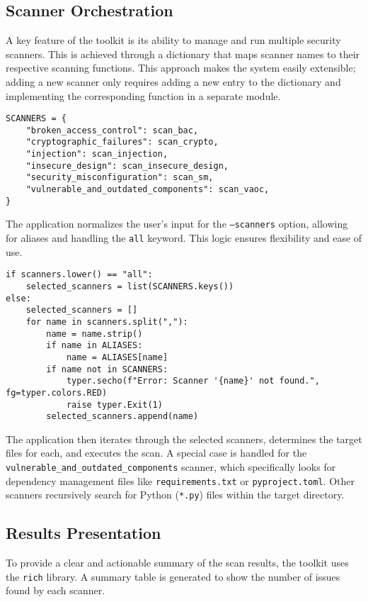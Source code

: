 \subsection{Scanner Orchestration}

A key feature of the toolkit is its ability to manage and run multiple security scanners. This is achieved through a dictionary that maps scanner names to their respective scanning functions. This approach makes the system easily extensible; adding a new scanner only requires adding a new entry to the dictionary and implementing the corresponding function in a separate module.

\begin{verbatim}
SCANNERS = {
    "broken_access_control": scan_bac,
    "cryptographic_failures": scan_crypto,
    "injection": scan_injection,
    "insecure_design": scan_insecure_design,
    "security_misconfiguration": scan_sm,
    "vulnerable_and_outdated_components": scan_vaoc,
}
\end{verbatim}

The application normalizes the user's input for the \texttt{--scanners} option, allowing for aliases and handling the \texttt{all} keyword. This logic ensures flexibility and ease of use.

\begin{verbatim}
if scanners.lower() == "all":
    selected_scanners = list(SCANNERS.keys())
else:
    selected_scanners = []
    for name in scanners.split(","):
        name = name.strip()
        if name in ALIASES:
            name = ALIASES[name]
        if name not in SCANNERS:
            typer.secho(f"Error: Scanner '{name}' not found.", fg=typer.colors.RED)
            raise typer.Exit(1)
        selected_scanners.append(name)
\end{verbatim}

The application then iterates through the selected scanners, determines the target files for each, and executes the scan. A special case is handled for the \texttt{vulnerable_and_outdated_components} scanner, which specifically looks for dependency management files like \texttt{requirements.txt} or \texttt{pyproject.toml}. Other scanners recursively search for Python (\texttt{*.py}) files within the target directory.

\subsection{Results Presentation}

To provide a clear and actionable summary of the scan results, the toolkit uses the \texttt{rich} library. A summary table is generated to show the number of issues found by each scanner.

